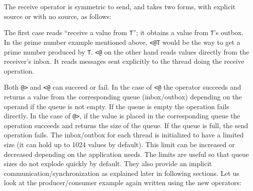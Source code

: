 The receive operator is symmetric to send, and takes two forms, with explicit
source or with no source, as follows:


\noindent
The first case reads ``receive a value from \texttt{T}''; it obtains a value
from \texttt{T}'s outbox. In the prime number example mentioned
above, \texttt{<@T} would be the way to get a prime number produced by
\texttt{T}. \texttt{{<}@} on the other hand reads values directly from the
receiver's inbox.  It reads messages sent explicitly to the thread doing the
receive operation.

Both \texttt{@>} and \texttt{{<}@} can succeed or fail. In the case of
\texttt{{<}@} the operator succeeds and returns a value from the corresponding
queue (inbox/outbox) depending on the operand if the queue is not empty. If the
queue is empty the operation fails directly. In the case of \texttt{@>}, if the
value is placed in the corresponding queue the operation succeeds and returns
the size of the queue. If the queue is full, the send operation fails. The
inbox/outbox for each thread is initialized to have a limited size (it can hold
up to 1024 values by default). This limit can be increased or decreased
depending on the application needs. The limits are useful so that queue sizes do
not explode quickly by default. They also provide an implicit
communication/synchronization as explained later in following sections.  Let us
look at the producer/consumer example again written using the new operators:


